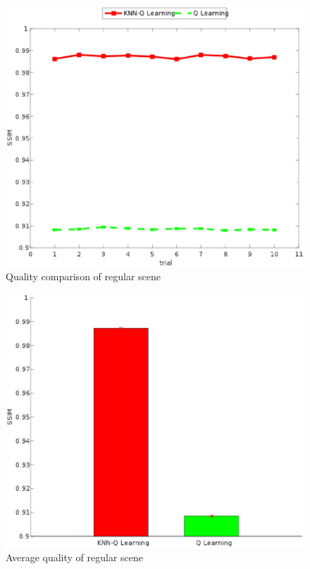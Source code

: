 \documentclass[twocolumn]{article}
\begin{document}
\begin{figure}[htbp]
\centering
\includegraphics[width=\columnwidth]{regular_ssim_compare}
\caption{Quality comparison of regular scene}
\label{regular_ssim_compare}
\end{figure}
\begin{figure}[htbp]
\centering
\includegraphics[width=\columnwidth]{regular_ssim_bar_graph}
\caption{Average quality of regular scene }
\label{regular_ssim_bar_graph}
\end{figure}
\end{document}
